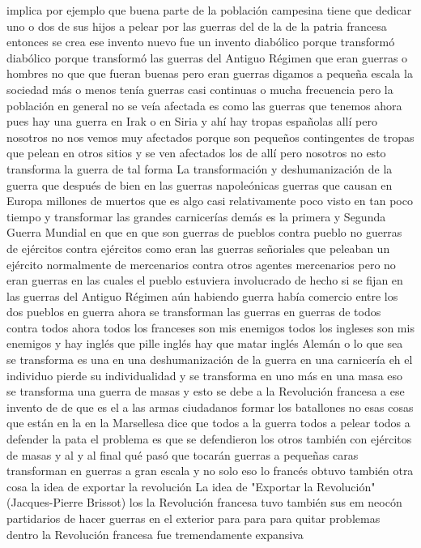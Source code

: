 implica por ejemplo que buena parte de la población campesina tiene que dedicar uno o dos de sus hijos a pelear por las guerras del
de la de la patria francesa entonces se crea ese invento nuevo fue un invento diabólico porque transformó diabólico
porque transformó las guerras del Antiguo Régimen que eran guerras o hombres no que que fueran buenas pero eran guerras digamos a pequeña escala
la sociedad más o menos tenía guerras casi continuas o mucha frecuencia pero la población en general no se veía afectada
es como las guerras que tenemos ahora pues hay una guerra en Irak o en Siria y ahí hay tropas españolas allí
pero nosotros no nos vemos muy afectados porque son pequeños contingentes de tropas que pelean en otros sitios
y se ven afectados los de allí pero nosotros no esto transforma la guerra de tal forma
La transformación y deshumanización de la guerra
que después de bien en las guerras napoleónicas guerras que causan en Europa millones de muertos que es algo casi
relativamente poco visto en tan poco tiempo y transformar las grandes carnicerías demás es la primera y Segunda Guerra Mundial
en que en que son guerras de pueblos contra pueblo no guerras de ejércitos contra ejércitos como eran las guerras señoriales
que peleaban un ejército normalmente de mercenarios contra otros agentes mercenarios pero no eran guerras en las cuales el pueblo estuviera involucrado
de hecho si se fijan en las guerras del Antiguo Régimen aún habiendo guerra había comercio entre los dos pueblos en guerra ahora se transforman las guerras
en guerras de todos contra todos ahora todos los franceses son mis enemigos todos los ingleses son mis enemigos
y hay inglés que pille inglés hay que matar inglés Alemán o lo que sea se transforma es una en una deshumanización de la guerra
en una carnicería eh el individuo pierde su individualidad y se transforma en uno más en una masa eso se transforma una guerra de masas
y esto se debe a la Revolución francesa a ese invento de de que es el a las armas ciudadanos
formar los batallones no esas cosas que están en la en la Marsellesa dice que todos a la guerra
todos a pelear todos a defender la pata el problema es que se defendieron los otros también con ejércitos de masas
y al y al final qué pasó que tocarán guerras a pequeñas caras transforman en guerras a gran escala
y no solo eso lo francés obtuvo también otra cosa la idea de exportar la revolución
La idea de "Exportar la Revolución" (Jacques-Pierre Brissot)
los la Revolución francesa tuvo también sus em neocón
partidarios de hacer guerras en el exterior para para para quitar problemas dentro la Revolución francesa fue tremendamente expansiva
